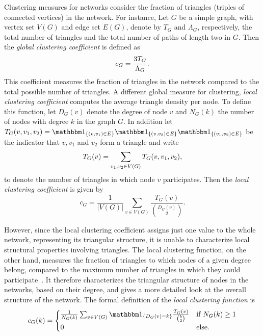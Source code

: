 Clustering measures for networks consider the fraction of triangles (triples of connected vertices) in the network. 
For instance, Let $G$ be a simple graph, with vertex set $V(G)$ and edge set $E(G)$, denote by $T_G$ and $\Lambda_G$, respectively, the total number of triangles and the total number of paths of length two in $G$. Then the \emph{global clustering coefficient} is defined as
\[
	c_G = \frac{3 T_G}{\Lambda_G}.
\]
This coefficient measures the fraction of triangles in the network compared to the total possible number of triangles. A different global measure for clustering, \emph{local clustering coefficient} computes the average triangle density per node. To define this function, let $D_G(v)$ denote the degree of node $v$ and $N_G(k)$ the number of nodes with degree $k$ in the graph $G$. In addition let $\T_G(v,v_1,v_2) = \ind{(v,v_1) \in E} \ind{(v, v_2) \in E} \ind{(v_1, v_2) \in E}$ be the indicator that $v, v_1$ and $v_2$ form a triangle and write
\begin{equation}
	T_G(v) = \sum_{v_1, v_2 \in V(G)} T_G(v,v_1,v_2),
\end{equation}
to denote the number of triangles in which node $v$ participates. Then the \emph{local clustering coefficient} is given by
\[
	c_G = \frac{1}{|V(G)|} \sum_{v \in V(G)} \frac{T_G(v)}{\binom{D_G(v)}{2}}.
\]

However, since the local clustering coefficient assigns just one value to the whole network, representing its triangular structure, it is unable to characterize local structural properties involving triangles. The local clustering function, on the other hand, measures the fraction of triangles to which nodes of a given degree belong, compared to the maximum number of triangles in which they could participate~\cite{vazquez2002large,serrano2006clustering}. It therefore characterizes the triangular structure of nodes in the networks, based on their degree, and gives a more detailed look at the overall structure of the network. The formal definition of the \emph{local clustering function} is 
\begin{equation}\label{eq:def_local_clustering_general}
	c_{G}(k) = \begin{cases}
		\frac{1}{N_G(k)} \sum_{v \in V(G)}  \ind{D_G(v) = k} \frac{\T_G(v)}{\binom{k}{2}} &\mbox{if } N_G(k) \ge 1\\
		0 &\mbox{else.}
	\end{cases}
\end{equation} 

